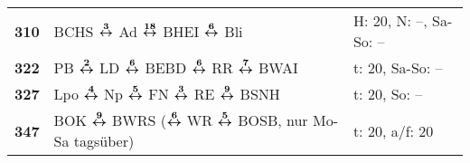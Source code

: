 \begin{minipage}[t]{0.45\textwidth}
\begin{tabular}{>{\bfseries}L{1.2cm}L{9.0cm}L{3.0cm}}
\bus{} 310    & BCHS $\boldsymbol{\overset{3}{\leftrightarrow}}$ Ad $\boldsymbol{\overset{18}{\leftrightarrow}}$ BHEI $\boldsymbol{\overset{6}{\leftrightarrow}}$ Bli                                                                                                               & H: 20, N: --, Sa-So: --    \\
\bus{} 322    & PB $\boldsymbol{\overset{2}{\leftrightarrow}}$ LD $\boldsymbol{\overset{6}{\leftrightarrow}}$ BEBD $\boldsymbol{\overset{6}{\leftrightarrow}}$ RR $\boldsymbol{\overset{7}{\leftrightarrow}}$ BWAI                                                                                                  & t: 20, Sa-So: --           \\
\bus{} 327    & Lpo $\boldsymbol{\overset{4}{\leftrightarrow}}$ Np $\boldsymbol{\overset{5}{\leftrightarrow}}$ FN $\boldsymbol{\overset{3}{\leftrightarrow}}$ RE $\boldsymbol{\overset{9}{\leftrightarrow}}$ BSNH                                                                                                   & t: 20, So: --              \\
\bus{} 347    & BOK $\boldsymbol{\overset{9}{\leftrightarrow}}$ BWRS ($\boldsymbol{\overset{6}{\leftrightarrow}}$ WR $\boldsymbol{\overset{5}{\leftrightarrow}}$ BOSB, nur Mo-Sa tagsüber)                                                                                          & t: 20, a/f: 20             \\
\hline
\end{tabular}
\end{minipage}

